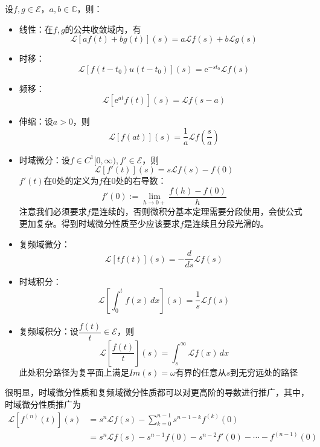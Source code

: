 \begin{proposition}[拉普拉斯变换的性质]
    设$f,g\in\mathcal{E} $，$a,b\in\mathbb{C}$，则：\begin{itemize}
        \item 线性：在$f,g$的公共收敛域内，有\[\mathcal{L} [af(t)+bg(t)](s)=a\mathcal{L} f(s)+b\mathcal{L} g(s)\]
        \item 时移：\[\mathcal{L} [f(t-t_0)u(t-t_0)](s)=\mathrm{e}^{-s t_0}\mathcal{L} f(s)\]
        \item 频移：\[\mathcal{L} [\mathrm{e}^{a t}f(t)](s)=\mathcal{L} f(s-a)\]
        \item 伸缩：设$a>0$，则\[\mathcal{L} [f(at)](s)=\frac{1}{a}\mathcal{L} f\left(\frac{s}{a}\right)\]
        \item 时域微分：设$f\in C^1[0,\infty),f'\in\mathcal{E} $，则\[\mathcal{L} [f'(t)](s)=s\mathcal{L} f(s)-f(0)\]
        $f'(t)$在0处的定义为$f$在0处的右导数：$$f'(0):=\lim_{h\to 0+}\dfrac{f(h)-f(0)}{h}$$
        注意我们必须要求$f$是连续的，否则微积分基本定理需要分段使用，会使公式更加复杂。得到时域微分性质至少应该要求$f$是连续且分段光滑的。
        \item 复频域微分：\[\mathcal{L} [t f(t)](s)=-\frac{d}{ds}\mathcal{L} f(s)\]
        \item 时域积分：\[\mathcal{L} \left[\int_0^t f(x)\,dx\right](s)=\frac{1}{s}\mathcal{L} f(s)\]
        \item 复频域积分：设$\dfrac{f(t)}{t}\in\mathcal{E} $，则\[\mathcal{L} \left[\frac{f(t)}{t}\right](s)=\int_s^{\infty}\mathcal{L}f(x)\,dx\]
        此处积分路径为复平面上满足$Im(s)=\omega$有界的任意从$s$到无穷远处的路径
    \end{itemize}
\end{proposition}
\begin{remark}
    很明显，时域微分性质和复频域微分性质都可以对更高阶的导数进行推广，其中，时域微分性质推广为\begin{align*}
\mathcal{L} [f^{(n)}(t)](s)&=s^n\mathcal{L} f(s)-\sum_{k=0}^{n-1}s^{n-1-k}f^{(k)}(0)\\
&=s^n\mathcal{L} f(s)-s^{n-1}f(0)-s^{n-2}f'(0)-\cdots -f^{(n-1)}(0)
\end{align*}
\end{remark}
